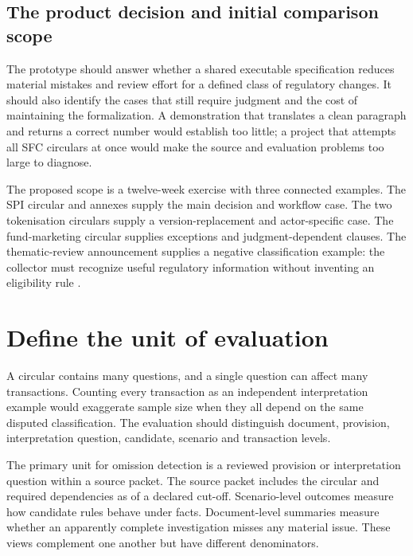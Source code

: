 \subsection{The product decision and initial comparison scope}
\label{merge:P-04-prototype:00}

\label{sec:prototype}

The prototype should answer whether a shared executable specification reduces
material mistakes and review effort for a defined class of regulatory changes.
It should also identify the cases that still require judgment and the cost of
maintaining the formalization. A demonstration that translates a clean paragraph
and returns a correct number would establish too little; a project that attempts
all SFC circulars at once would make the source and evaluation problems too large
to diagnose.

The proposed scope is a twelve-week exercise with three connected examples. The
SPI circular and annexes supply the main decision and workflow case. The two
tokenisation circulars supply a version-replacement and actor-specific case.
The fund-marketing circular supplies exceptions and judgment-dependent clauses.
The thematic-review announcement supplies a negative classification example:
the collector must recognize useful regulatory information without inventing an
eligibility rule \citep{sfcspi,sfctoken2023,sfctoken2026,sfcmarketing,sfcreview2025}.


\section{Define the unit of evaluation}
\label{merge:M09:01}


A circular contains many questions, and a single question can affect many
transactions. Counting every transaction as an independent interpretation example
would exaggerate sample size when they all depend on the same disputed
classification. The evaluation should distinguish document, provision,
interpretation question, candidate, scenario and transaction levels.

The primary unit for omission detection is a reviewed provision or interpretation
question within a source packet. The source packet includes the circular and
required dependencies as of a declared cut-off. Scenario-level outcomes measure
how candidate rules behave under facts. Document-level summaries measure whether
an apparently complete investigation misses any material issue. These views
complement one another but have different denominators.

